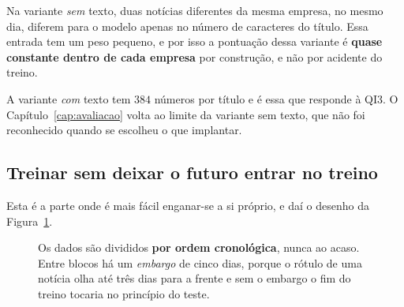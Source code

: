 \begin{tcolorbox}[colback=orange!5, colframe=orange!45, boxrule=0.5pt, arc=2pt]
Na variante \emph{sem} texto, duas notícias diferentes da mesma empresa, no mesmo dia, diferem
para o modelo apenas no número de caracteres do título. Essa entrada tem um peso pequeno, e por
isso a pontuação dessa variante é \textbf{quase constante dentro de cada empresa} por
construção, e não por acidente do treino.
\end{tcolorbox}

A variante \emph{com} texto tem $384$ números por título e é essa que responde à \gls{QI}3. O
Capítulo~\ref{cap:avaliacao} volta ao limite da variante sem texto, que não foi reconhecido quando
se escolheu o que implantar.

\subsection{Treinar sem deixar o futuro entrar no treino}

Esta é a parte onde é mais fácil enganar-se a si próprio, e daí o desenho da
Figura~\ref{fig:divisao}.

\begin{figure}[ht]
\centering
{}
\caption[Divisão temporal com embargo]{Os dados são divididos \textbf{por ordem cronológica}, nunca
ao acaso. Entre blocos há um \emph{embargo} de cinco dias, porque o rótulo de uma notícia olha até
três dias para a frente e sem o embargo o fim do treino tocaria no princípio do teste.}
\label{fig:divisao}
\end{figure}

